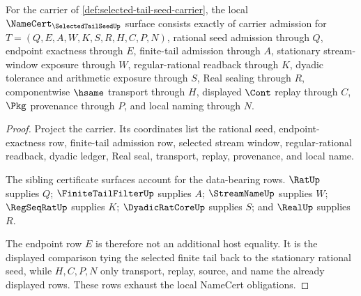 \begin{theorem}
\label{thm:selected-tail-seed-namecert-obligations}
For the carrier of \autoref{def:selected-tail-seed-carrier}, the local $\NameCert_{\SelectedTailSeedUp}$ surface consists exactly of carrier admission for $T=(Q,E,A,W,K,S,R,H,C,P,N)$, rational seed admission through $Q$, endpoint exactness through $E$, finite-tail admission through $A$, stationary stream-window exposure through $W$, regular-rational readback through $K$, dyadic tolerance and arithmetic exposure through $S$, Real sealing through $R$, componentwise $\hsame$ transport through $H$, displayed $\Cont$ replay through $C$, $\Pkg$ provenance through $P$, and local naming through $N$.
\end{theorem}
\begin{proof}
Project the carrier. Its coordinates list the rational seed, endpoint-exactness row, finite-tail admission row, selected stream window, regular-rational readback, dyadic ledger, Real seal, transport, replay, provenance, and local name.

The sibling certificate surfaces account for the data-bearing rows. $\RatUp$ supplies $Q$; $\FiniteTailFilterUp$ supplies $A$; $\StreamNameUp$ supplies $W$; $\RegSeqRatUp$ supplies $K$; $\DyadicRatCoreUp$ supplies $S$; and $\RealUp$ supplies $R$.

The endpoint row $E$ is therefore not an additional host equality. It is the displayed comparison tying the selected finite tail back to the stationary rational seed, while $H,C,P,N$ only transport, replay, source, and name the already displayed rows. These rows exhaust the local NameCert obligations.
\end{proof}

